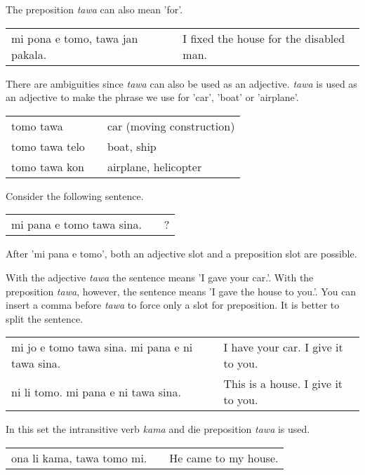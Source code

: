 The preposition \textit{tawa} can also mean 'for'.

\begin{supertabular}{p{5,5cm}|ll}
    mi pona e tomo, tawa jan pakala. &  & I fixed the house for the disabled man. \\
\end{supertabular}

There are ambiguities since \textit{tawa} can also be used as an adjective.
\textit{tawa} is used as an adjective to make the phrase we use for 'car', 'boat' or 'airplane'.

\begin{supertabular}{p{5,5cm}|ll}
    tomo tawa      &  & car (moving construction) \\
    tomo tawa telo &  & boat, ship                \\
    tomo tawa kon  &  & airplane, helicopter      \\
\end{supertabular}

Consider the following sentence.

\begin{supertabular}{p{5,5cm}|ll}
    mi pana e tomo tawa sina. &  & ? \\
\end{supertabular}

After 'mi pana e tomo', both an adjective slot and a preposition slot are possible.

With the adjective \textit{tawa} the sentence means 'I gave your car.'.
With the preposition \textit{tawa}, however, the sentence means 'I gave the house to you.'.
You can insert a comma before \textit{tawa} to force only a slot for preposition.
It is better to split the sentence.

\begin{supertabular}{p{5,5cm}|ll}
    mi jo e tomo tawa sina. mi pana e ni tawa sina. &  & I have your car. I give it to you. \\
    ni li tomo. mi pana e ni tawa sina.             &  & This is a house. I give it to you. \\
\end{supertabular}

In this set the intransitive verb \textit{kama} and die preposition \textit{tawa} is used.

\begin{supertabular}{p{5,5cm}|ll}
    ona li kama, tawa tomo mi. &  & He came to my house. \\
\end{supertabular}

